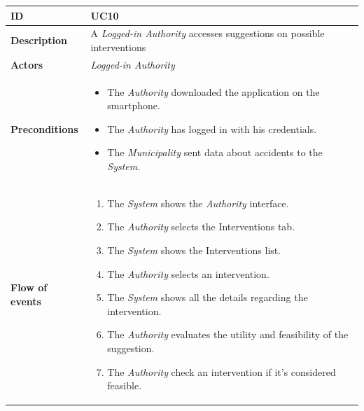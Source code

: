 \documentclass {article}
\begin{document}
	\begin{longtable}{| p{3 cm} | p{10.5cm} |} 
			\hline
			{\bf ID} & UC10 \\
			\hline
			{\bf Description} & A {\it Logged-in Authority} accesses suggestions on possible interventions \\
			\hline
			{\bf Actors} & {\it Logged-in Authority}\\
			\hline
			{\bf Preconditions} & 
					\begin{itemize}
						\item The {\it Authority} downloaded the application on the smartphone.
						\item The {\it Authority} has logged in with his credentials.
						\item The {\it Municipality} sent data about accidents to the {\it System}.
						\end{itemize}	\\
			\hline
			{\bf Flow of events} &	
					\begin{enumerate}
						\item The {\it System} shows the {\it Authority} interface.
						\item The {\it Authority} selects the Interventions tab.
						\item The {\it System} shows the Interventions list. 
						\item The {\it Authority} selects an intervention.
						\item The {\it System} shows all the details regarding the intervention. 
						\item The {\it Authority} evaluates the utility and feasibility of the suggestion.
						\item The {\it Authority} check an intervention if it's considered feasible.
						

\end{enumerate}
\end{longtable}
\end{document}
